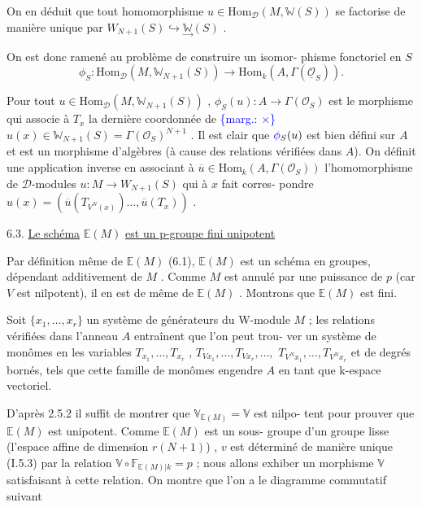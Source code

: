 \documentclass[11pt]{article}
\newcommand{\scanpage}[1]{\par\bigskip\noindent{\small\sffamily[scan #1]}\par}
\newcommand{\mspage}[1]{{\small\sffamily[p.\,#1]}}
\newcommand{\hand}[1]{\textcolor{blue}{#1}}
\newcommand{\margin}[1]{\textcolor{blue}{\{\textsf{marg.:} #1\}}}
\newcommand{\uline}[1]{\underline{#1}}
\begin{document}
On en déduit que tout homomorphisme $u \in \mathrm{Hom}_{\mathcal{D}}(M, \mathbb{W}(S))$ se
factorise de manière unique par $W_{N+1}(S) \hookrightarrow \underset{\rightarrow}{\mathbb{W}}(S)$ .

On est donc ramené au problème de construire un isomor-%
phisme fonctoriel en $S$
\[ \phi_S : \mathrm{Hom}_{\mathcal{D}}(M, \mathbb{W}_{N+1}(S)) \rightarrow \mathrm{Hom}_k(A, \Gamma(\underline{\mathcal{O}}_S)) . \]

Pour tout $u \in \mathrm{Hom}_{\mathcal{D}}(M, \mathbb{W}_{N+1}(S))$ , $\phi_S(u) : A \rightarrow \Gamma(\mathcal{O}_S)$ est
le morphisme qui associe à $T_x$ la dernière coordonnée de
\margin{$\times$} $u(x) \in \mathbb{W}_{N+1}(S) = \Gamma(\mathcal{O}_S)^{N+1}$ . Il est clair que $\hand{\phi}_S(u)$ est bien défini
sur $A$ et est un morphisme d'algèbres (à cause des relations vérifiées
dans $A$). On définit une application inverse en associant à $\overline{u} \in \mathrm{Hom}_k(A, \Gamma(\mathcal{O}_S))$
l'homomorphisme de $\mathcal{D}$-modules $u : M \rightarrow W_{N+1}(S)$ qui à $x$ fait corres-%
pondre $u(x) = (\overline{u}(T_{V^N(x)})\ldots, \overline{u}(T_x))$ .

6.3. \uline{Le schéma} $\mathbb{E}(M)$ \uline{est un p-groupe fini unipotent}

Par définition même de $\mathbb{E}(M)$ (6.1), $\mathbb{E}(M)$ est un schéma
en groupes, dépendant additivement de $M$ . Comme $M$ est annulé par une
puissance de $p$ (car $V$ est nilpotent), il en est de même de $\mathbb{E}(M)$ .
Montrons que $\mathbb{E}(M)$ est fini.

\mspage{\hand{51}}

\clearpage
\scanpage{129/52}
\mspage{\hand{II 24}}

Soit $\{x_1,\dots,x_r\}$ un système de générateurs du W-module $M$ ;
les relations vérifiées dans l'anneau $A$ entraînent que l'on peut trou-%
ver un système de monômes en les variables $T_{x_1},\dots,T_{x_r}$ , $T_{Vx_1},\dots,T_{Vx_r},\dots,$
$T_{V^Nx_1},\dots,T_{V^Nx_r}$ et de degrés bornés, tels que cette famille de monômes
engendre $A$ en tant que k-espace vectoriel.

D'après 2.5.2 il suffit de montrer que $\mathbb{V}_{\mathbb{E}(M)} = \mathbb{V}$ est nilpo-%
tent pour prouver que $\mathbb{E}(M)$ est unipotent. Comme $\mathbb{E}(M)$ est un sous-%
groupe d'un groupe lisse (l'espace affine de dimension $r(N+1)$) , $v$ est
déterminé de manière unique (I.5.3) par la relation $\mathbb{V}\circ\mathbb{F}_{\mathbb{E}(M)|k} = p$ ;
nous allons exhiber un morphisme $\mathbb{V}$ satisfaisant à cette relation. On
montre que l'on a le diagramme commutatif suivant
\end{document}
